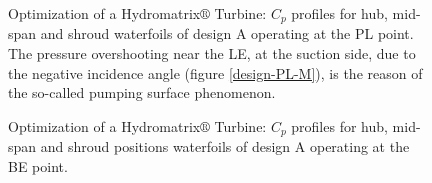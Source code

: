 \begin{figure}[h!]
\begin{minipage}[b]{1\linewidth}
 \centering
\end{minipage}
\caption{Optimization of a Hydromatrix$\circledR$ Turbine: $C_p$ profiles for hub, mid-span and shroud waterfoils of design A operating at the PL point. The pressure overshooting near the LE, at the suction side, due to the negative incidence angle (figure \ref{design-PL-M}), is the reason of the so-called pumping surface phenomenon.}
\label{LOADPLM}
\end{figure}

\begin{figure}[h!]
\begin{minipage}[b]{1\linewidth}
 \centering
\end{minipage}
\caption{Optimization of a Hydromatrix$\circledR$ Turbine: $C_p$ profiles for hub, mid-span and shroud positions waterfoils of design A operating at the BE point.}
\label{LOADBEM}
\end{figure}

